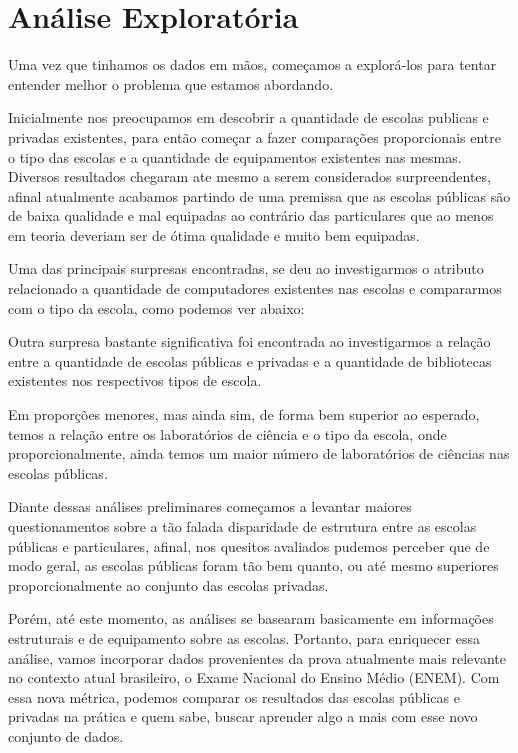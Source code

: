 \documentclass[review]{elsarticle}
\begin{document}
\section{Análise Exploratória}
Uma vez que tinhamos os dados em m\~aos, come\c{c}amos a explorá-los para tentar entender melhor o problema que estamos abordando.

Inicialmente nos preocupamos em descobrir a quantidade de escolas publicas e privadas existentes, para ent\~ao come\c{c}ar a fazer compara\c{c}\~oes proporcionais entre o tipo das escolas e a quantidade de equipamentos existentes nas mesmas. Diversos resultados chegaram at\’e mesmo a serem considerados surpreendentes, afinal atualmente acabamos partindo de uma premissa que as escolas públicas s\~ao de baixa qualidade e mal equipadas ao contrário das particulares que ao menos em teoria deveriam ser de ótima qualidade e muito bem equipadas.

Uma das principais surpresas encontradas, se deu ao investigarmos o atributo relacionado a quantidade de computadores existentes nas escolas e compararmos com o tipo da escola, como podemos ver abaixo:

Outra surpresa bastante significativa foi encontrada ao investigarmos a relação entre a quantidade de escolas públicas e privadas e a quantidade de bibliotecas existentes nos respectivos tipos de escola.

Em proporções menores, mas ainda sim, de forma bem superior ao esperado, temos a relação entre os laboratórios de ciência e o tipo da escola, onde proporcionalmente, ainda temos um maior número de laboratórios de ciências nas escolas públicas.

Diante dessas análises preliminares começamos a levantar maiores questionamentos sobre a tão falada disparidade de estrutura entre as escolas públicas e particulares, afinal, nos quesitos avaliados pudemos perceber que de modo geral, as escolas públicas foram tão bem quanto, ou até mesmo superiores proporcionalmente ao conjunto das escolas privadas.  

Porém, até este momento, as análises se basearam basicamente em informações estruturais e de equipamento sobre as escolas. Portanto, para enriquecer essa análise, vamos incorporar dados provenientes da prova atualmente mais relevante no contexto atual brasileiro, o Exame Nacional do Ensino Médio (ENEM). Com essa nova métrica, podemos comparar os resultados das escolas públicas e privadas na prática e quem sabe, buscar aprender algo a mais com esse novo conjunto de dados. 
\end{document}
